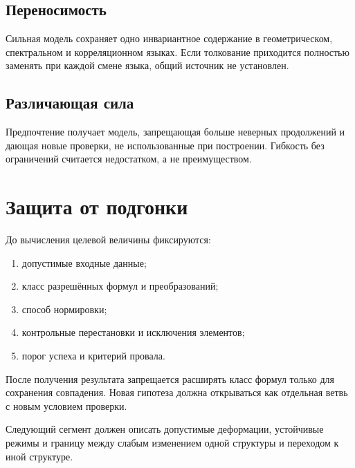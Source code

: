 \section{Переносимость}

Сильная модель сохраняет одно инвариантное содержание в геометрическом,
спектральном и корреляционном языках. Если толкование приходится полностью
заменять при каждой смене языка, общий источник не установлен.

\section{Различающая сила}

Предпочтение получает модель, запрещающая больше неверных продолжений и
дающая новые проверки, не использованные при построении. Гибкость без
ограничений считается недостатком, а не преимуществом.

\chapter{Защита от подгонки}

До вычисления целевой величины фиксируются:
\begin{enumerate}
 \item допустимые входные данные;
 \item класс разрешённых формул и преобразований;
 \item способ нормировки;
 \item контрольные перестановки и исключения элементов;
 \item порог успеха и критерий провала.
\end{enumerate}

После получения результата запрещается расширять класс формул только для
сохранения совпадения. Новая гипотеза должна открываться как отдельная ветвь с
новым условием проверки.

Следующий сегмент должен описать допустимые деформации, устойчивые режимы и
границу между слабым изменением одной структуры и переходом к иной структуре.